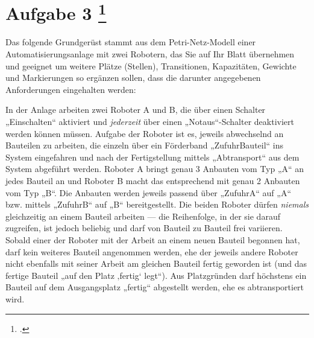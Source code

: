 \documentclass{lehramt-informatik-aufgabe}
\begin{document}
\section{Aufgabe 3
\footcite{66116:2015:03}}

Das folgende Grundgerüst stammt aus dem Petri-Netz-Modell einer
Automatisierungsanlage mit zwei Robotern, das Sie auf Ihr Blatt
übernehmen und geeignet um weitere Plätze (Stellen), Transitionen,
Kapazitäten, Gewichte und Markierungen so ergänzen sollen, dass die
darunter angegebenen Anforderungen eingehalten werden:

In der Anlage arbeiten zwei Roboter A und B, die über einen Schalter
„Einschalten“ aktiviert und \emph{jederzeit} über einen
„Notaus“-Schalter deaktiviert werden können müssen. Aufgabe der Roboter ist es,
jeweils abwechselnd an Bauteilen zu arbeiten, die einzeln über ein
Förderband „ZufuhrBauteil“ ins System eingefahren und nach der
Fertigstellung mittels „Abtransport“ aus dem System abgeführt werden.
Roboter A bringt genau 3 Anbauten vom Typ „A“ an jedes Bauteil an und
Roboter B macht das entsprechend mit genau 2 Anbauten vom Typ „B“. Die
Anbauten werden jeweils passend über „ZufuhrA“ auf „A“ bzw. mittels
„ZufuhrB“ auf „B“ bereitgestellt. Die beiden Roboter dürfen
\emph{niemals} gleichzeitig an einem Bauteil arbeiten — die Reihenfolge,
in der sie darauf zugreifen, ist jedoch beliebig und darf von Bauteil zu
Bauteil frei variieren. Sobald einer der Roboter mit der Arbeit an einem
neuen Bauteil begonnen hat, darf kein weiteres Bauteil angenommen
werden, ehe der jeweils andere Roboter nicht ebenfalls mit seiner Arbeit
am gleichen Bauteil fertig geworden ist (und das fertige Bauteil „auf
den Platz ‚fertig‘ legt“). Aus Platzgründen darf höchstens ein Bauteil
auf dem Ausgangsplatz „fertig“ abgestellt werden, ehe es abtransportiert
wird.
\end{document}
